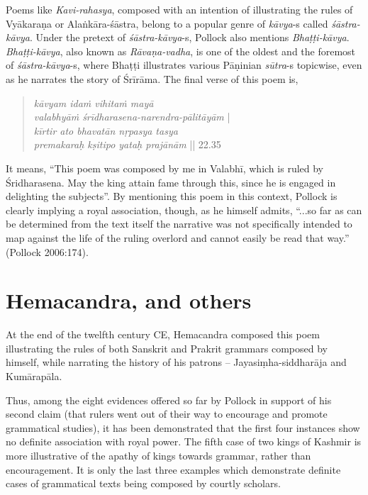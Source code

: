Poems like {\sl Kavi-rahasya}, composed with an intention of illustrating the rules of Vyākaraṇa or Alaṅkāra-śāstra, belong to a popular genre of {\sl kāvya}-s called {\sl śāstra-kāvya}. Under the pretext of {\sl śāstra-kāvya}-s, Pollock also mentions {\sl Bhaṭṭi-kāvya}. {\sl Bhaṭṭi-kāvya}, also known as {\sl Rāvaṇa-vadha}, is one of the oldest and the foremost of {\sl śāstra-kāvya}-s, where Bhaṭṭi illustrates various Pāṇinian {\sl sūtra}-s topicwise, even as he narrates the story of Śrīrāma. The final verse of this poem is,
\begin{quote}
{{\sl kāvyam idaṁ vihitaṁ mayā}}\\[2pt]
\phantom{\quad} {{\sl valabhyāṁ śrīdharasena-narendra-pālitāyām}} |\\[2pt]
{{\sl kīrtir ato bhavatān nṛpasya tasya}}\\[2pt] 
\phantom{\quad} {{\sl  premakaraḥ kṣitipo yataḥ prajānām}} || 22.35 
\end{quote}
It means, ``This poem was composed by me in Valabhī, which is ruled by Śridharasena. May the king attain fame through this, since he is engaged in delighting the subjects''. By mentioning this poem in this context, Pollock is clearly implying a royal association, though, as he himself admits, ``...so far as can be determined from the text itself the narrative was not specifically intended to map against the life of the ruling overlord and cannot easily be read that way.'' (Pollock 2006:174). 

\section{Hemacandra, and others}\label{chap3-sec15}

At the end of the twelfth century CE, Hemacandra composed this poem illustrating the rules of both Sanskrit and Prakrit grammars composed by himself, while narrating the history of his patrons -- Jayasiṃha-siddharāja and Kumārapāla.

Thus, among the eight evidences offered so far by Pollock in support of his second claim (that rulers went out of their way to encourage and promote grammatical studies), it has been demonstrated that the first four instances show no definite association with royal power. The fifth case of two kings of Kashmir is more illustrative of the apathy of kings towards grammar, rather than encouragement. It is only the last three examples which demonstrate definite cases of grammatical texts being composed by courtly scholars.

